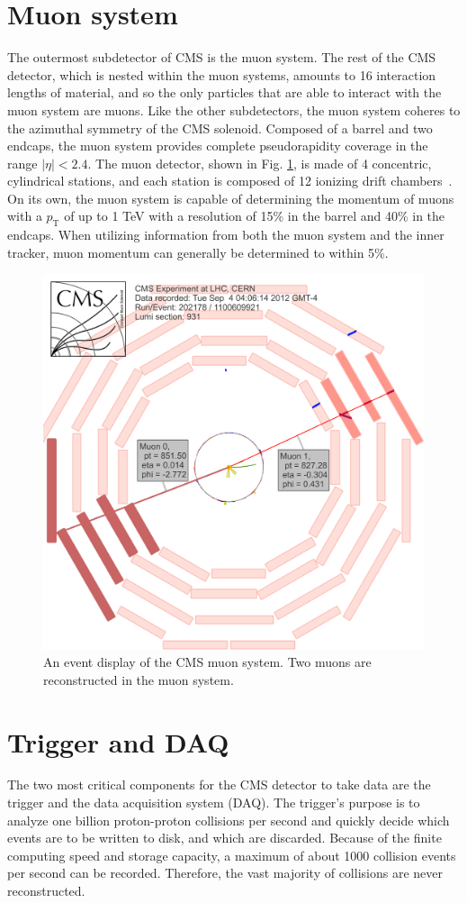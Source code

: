  
\section{Muon system}
The outermost subdetector of CMS is the muon system. The rest of the CMS detector, 
which is nested within the muon systems, amounts to 16 interaction lengths of material, 
and so the only particles that are able to interact with the muon system are muons. Like 
the other subdetectors, the muon system coheres to the azimuthal symmetry of the CMS 
solenoid. Composed of a barrel and two endcaps, the muon system provides complete 
pseudorapidity coverage in the range $|\eta|<2.4.$ The muon detector, shown in Fig. 
\ref{fig:MuonSystem}, is made of 4 concentric, cylindrical stations, and each station is 
composed of 12 ionizing drift chambers~\cite{Breskin:1244506}. On its own, the muon system 
is capable of determining the momentum of muons with a $p_{\text{T}}$ of up to 1 TeV with 
a resolution of 15\% in the barrel and 40\% in the endcaps. When utilizing information from 
both the muon system and the inner tracker, muon momentum can generally be determined 
to within 5\%.
\begin{figure}[h]
\centering
\includegraphics[width=0.5\linewidth]{figures/CMS/MuonSystem.png}
\caption{An event display of the CMS muon system. Two muons are reconstructed in the muon system.} 
\label{fig:MuonSystem}
\end{figure}

\section{Trigger and DAQ}
\label{sec:Trigger}

The two most critical components for the CMS detector to take data are the trigger and the data acquisition system (DAQ).  The trigger's purpose is to analyze one billion proton-proton collisions per second and quickly decide which events are to be written to disk, and which are discarded. Because of the finite computing speed and storage capacity, a maximum of about 1000 collision events per second can be recorded. Therefore, the vast majority of collisions are never reconstructed.


